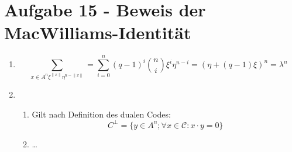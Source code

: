 \section*{Aufgabe 15 - Beweis der MacWilliams-Identität}
\begin{enumerate}
\item
	\[ \sum_{{x\in A^{n}} \xi^{\lVert x\rVert}\eta^{n-\lVert x\rVert}} =
	\sum_{i=0}^{n} (q - 1)^{i} \binom{n}{i} \xi^{i} \eta^{n-i} = \left(\eta +
	(q-1)\xi\right)^{n} = \lambda^{n} \]
\item
	\begin{enumerate}
		\item
		Gilt nach Definition des dualen Codes:
		\[ C^{\bot} = \{ y \in A^{n}; \forall x \in \mathcal{C} : x
		\cdot y = 0 \} \]
		\item
		\dots
	\end{enumerate}
\end{enumerate}
